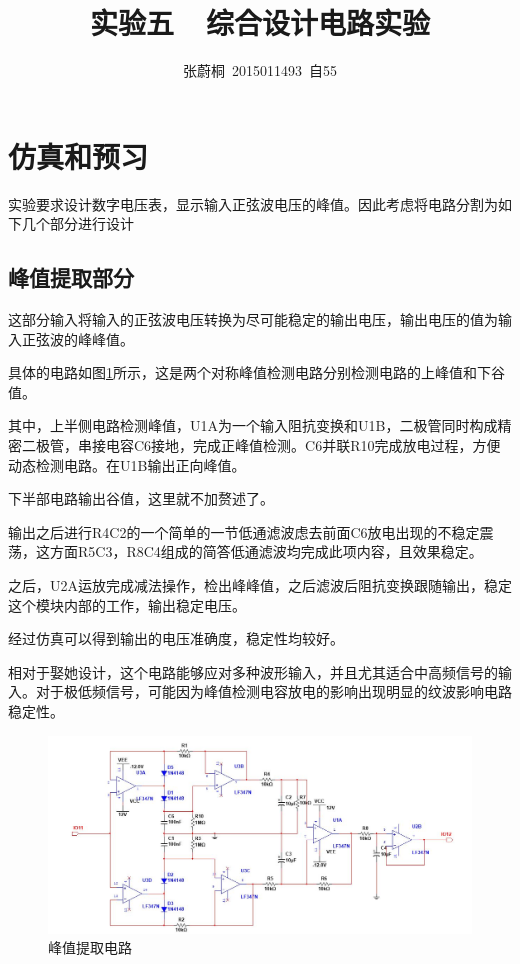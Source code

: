 \documentclass[UTF8,a4paper]{paper}
\title{实验五\ \ 综合设计电路实验}
\author{张蔚桐\ 2015011493\ 自55}
\begin{document}
\maketitle
\section{仿真和预习}
实验要求设计数字电压表，显示输入正弦波电压的峰值。因此考虑将电路分割为如下几个部分进行设计
\subsection{峰值提取部分}
这部分输入将输入的正弦波电压转换为尽可能稳定的输出电压，输出电压的值为输入正弦波的峰峰值。

具体的电路如图\ref{PP}所示，这是两个对称峰值检测电路分别检测电路的上峰值和下谷值。

其中，上半侧电路检测峰值，U1A为一个输入阻抗变换和U1B，二极管同时构成精密二极管，串接电容C6接地，完成正峰值检测。C6并联R10完成放电过程，方便动态检测电路。在U1B输出正向峰值。

下半部电路输出谷值，这里就不加赘述了。

输出之后进行R4C2的一个简单的一节低通滤波虑去前面C6放电出现的不稳定震荡，这方面R5C3，R8C4组成的简答低通滤波均完成此项内容，且效果稳定。

之后，U2A运放完成减法操作，检出峰峰值，之后滤波后阻抗变换跟随输出，稳定这个模块内部的工作，输出稳定电压。

经过仿真可以得到输出的电压准确度，稳定性均较好。

相对于娶她设计，这个电路能够应对多种波形输入，并且尤其适合中高频信号的输入。对于极低频信号，可能因为峰值检测电容放电的影响出现明显的纹波影响电路稳定性。

\begin{figure}\centering
\includegraphics[width=\textwidth]{PP.jpg}
\caption{峰值提取电路}\label{PP}
\end{figure}
\end{document}
